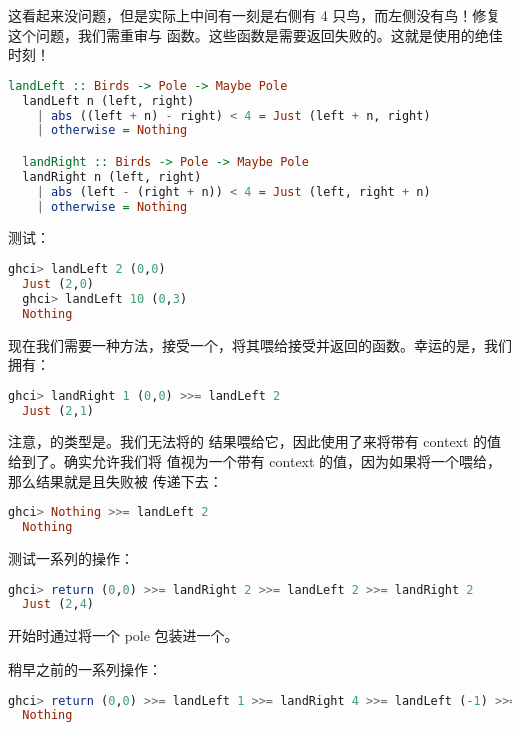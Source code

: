 \documentclass[./main.tex]{subfiles}
\begin{document}
这看起来没问题，但是实际上中间有一刻是右侧有 4 只鸟，而左侧没有鸟！修复这个问题，我们需重审与
函数。这些函数是需要返回失败的。这就是使用的绝佳时刻！

\begin{lstlisting}[language=Haskell]
  landLeft :: Birds -> Pole -> Maybe Pole
  landLeft n (left, right)
    | abs ((left + n) - right) < 4 = Just (left + n, right)
    | otherwise = Nothing

  landRight :: Birds -> Pole -> Maybe Pole
  landRight n (left, right)
    | abs (left - (right + n)) < 4 = Just (left, right + n)
    | otherwise = Nothing
\end{lstlisting}

测试：

\begin{lstlisting}[language=Haskell]
  ghci> landLeft 2 (0,0)
  Just (2,0)
  ghci> landLeft 10 (0,3)
  Nothing
\end{lstlisting}

现在我们需要一种方法，接受一个，将其喂给接受并返回的函数。幸运的是，我们
拥有\acode{>>=}：

\begin{lstlisting}[language=Haskell]
  ghci> landRight 1 (0,0) >>= landLeft 2
  Just (2,1)
\end{lstlisting}

注意，的类型是。我们无法将的
结果喂给它，因此使用了\acode{>>=}来将带有 context 的值给到了。\acode{>>=}确实允许我们将
值视为一个带有 context 的值，因为如果将一个喂给，那么结果就是且失败被
传递下去：

\begin{lstlisting}[language=Haskell]
  ghci> Nothing >>= landLeft 2
  Nothing
\end{lstlisting}

测试一系列的操作：

\begin{lstlisting}[language=Haskell]
  ghci> return (0,0) >>= landRight 2 >>= landLeft 2 >>= landRight 2
  Just (2,4)
\end{lstlisting}

开始时通过将一个 pole 包装进一个。

稍早之前的一系列操作：

\begin{lstlisting}[language=Haskell]
  ghci> return (0,0) >>= landLeft 1 >>= landRight 4 >>= landLeft (-1) >>= landRight (-2)
  Nothing
\end{lstlisting}
\end{document}
